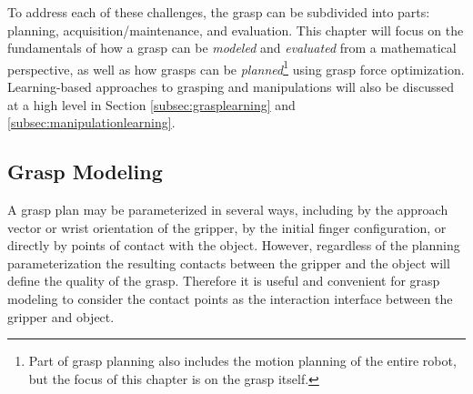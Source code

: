 To address each of these challenges, the grasp can be subdivided into parts: planning, acquisition/maintenance, and evaluation. This chapter will focus on the fundamentals of how a grasp can be \textit{modeled} and \textit{evaluated} from a mathematical perspective, as well as how grasps can be \textit{planned}\footnote{Part of grasp planning also includes the motion planning of the entire robot, but the focus of this chapter is on the grasp itself.} using grasp force optimization. Learning-based approaches to grasping and manipulations will also be discussed at a high level in Section \ref{subsec:grasplearning} and \ref{subsec:manipulationlearning}.

\subsection{Grasp Modeling} \label{subsec:graspmodel}
A grasp plan may be parameterized in several ways, including by the approach vector or wrist orientation of the gripper, by the initial finger configuration, or directly by points of contact with the object. However, regardless of the planning parameterization the resulting contacts between the gripper and the object will define the quality of the grasp. Therefore it is useful and convenient for grasp modeling to consider the contact points as the interaction interface between the gripper and object.

